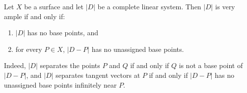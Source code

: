 Let $X$ be a surface and let $|D|$ be a complete linear system. Then $|D|$ is very ample if and only if:
\begin{enumerate}
\item[(a)] $|D|$ has no base points, and
\item[(b)] for every $P \in X$, $|D - P|$ has no unassigned base points.
\end{enumerate}
Indeed, $|D|$ separates the points $P$ and $Q$ if and only if $Q$ is not a base point of $|D - P|$, and $|D|$ separates tangent vectors at $P$ if and only if $|D - P|$ has no unassigned base points infinitely near $P$.
